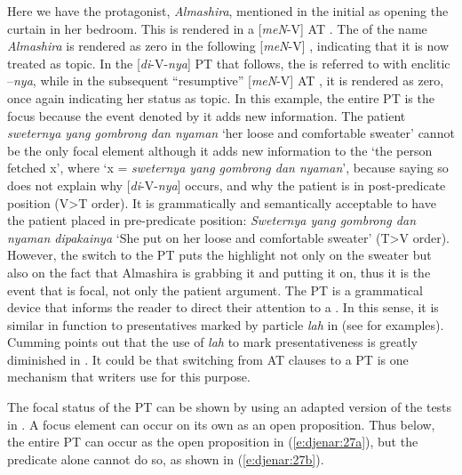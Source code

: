\documentclass[output=paper
,modfonts
,nonflat]{langsci/langscibook}
\begin{document}
\noindent
Here we have the protagonist, \textit{Almashira}, mentioned in the initial  as opening the curtain in her bedroom. This  is rendered in a [\textit{meN}-V] AT . The  of the name \textit{Almashira} is rendered as zero in the following [\textit{meN}-V] , indicating that it is now treated as topic. In the [\textit{di}-V-\textit{nya}] PT  that follows, the  is referred to with enclitic –\textit{nya}, while in the subsequent “resumptive” [\textit{meN}-V] AT , it is rendered as zero, once again indicating her status as topic. In this example, the entire PT  is the focus because the event denoted by it adds new information. The patient \textit{sweternya yang gombrong dan nyaman} ‘her loose and comfortable sweater’ cannot be the only focal element although it adds new information to the  ‘the person fetched x’, where ‘x =  \textit{sweternya yang gombrong dan nyaman}’, because saying so does not explain why [\textit{di}-V-\textit{nya}] occurs, and why the patient is in post-predicate position (V>T order). It is grammatically and semantically acceptable to have the patient placed in pre-predicate position: \textit{Sweternya yang gombrong dan nyaman dipakainya} ‘She put on her loose and comfortable sweater’ (T>V order). However, the switch to the PT  puts the highlight not only on the sweater but also on the fact that Almashira is grabbing it and putting it on, thus it is the event that is focal, not only the patient argument. The PT  is a grammatical device that informs the reader to direct their attention to a . In this sense, it is similar in function to presentatives marked by particle \textit{lah} in  (see \citealt[90]{Cumming1991} for examples). Cumming points out that the use of \textit{lah} to mark presentativeness is greatly diminished in . It could be that switching from AT clauses to a PT  is one mechanism that  writers use for this purpose.

The focal status of the PT  can be shown by using an adapted version of the tests in \citet[223]{Lambrecht1994}. A focus element can occur on its own as an open proposition. Thus below, the entire PT  can occur as the open proposition in (\ref{e:djenar:27a}), but the predicate alone cannot do so, as shown in (\ref{e:djenar:27b}).
\end{document}
